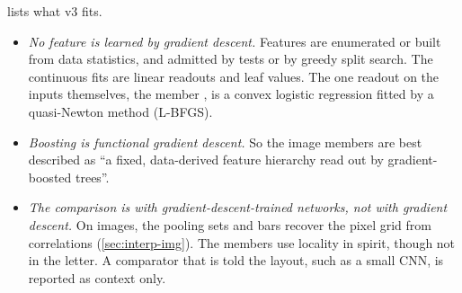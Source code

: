  lists what v3 fits.
\begin{itemize}
\item \emph{No feature is learned by gradient descent.} Features are enumerated or built from data statistics, and admitted by tests or by greedy split search. The continuous fits are linear readouts and leaf values. The one readout on the inputs themselves, the member , is a convex logistic regression fitted by a quasi-Newton method (L-BFGS).
\item \emph{Boosting is functional gradient descent.} So the image members are best described as ``a fixed, data-derived feature hierarchy read out by gradient-boosted trees''.
\item \emph{The comparison is with gradient-descent-trained networks, not with gradient descent.} On images, the pooling sets and bars recover the pixel grid from correlations (\cref{sec:interp-img}). The members use locality in spirit, though not in the letter. A comparator that is told the layout, such as a small CNN, is reported as context only.
\end{itemize}
